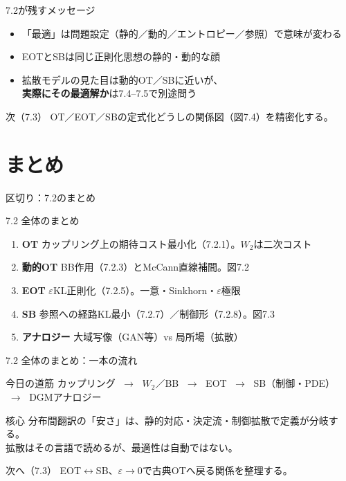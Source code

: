 \asmain
\begin{frame}{7.2が残すメッセージ}
    \begin{itemize}
        \item 「最適」は問題設定（静的／動的／エントロピー／参照）で意味が変わる
        \item EOTとSBは同じ正則化思想の静的・動的な顔
        \item 拡散モデルの見た目は動的OT／SBに近いが、\\
        \textbf{実際にその最適解か}は7.4--7.5で別途問う
    \end{itemize}
    \begin{block}{次（7.3）}
        OT／EOT／SBの定式化どうしの関係図（図7.4）を精密化する。
    \end{block}
\end{frame}
\section{まとめ}
\asmain
\begin{frame}{区切り：7.2のまとめ}
    \tableofcontents[currentsection]
\end{frame}
\asmain
\begin{frame}{7.2 全体のまとめ}
    \begin{enumerate}
        \item \textbf{OT}
        カップリング上の期待コスト最小化（7.2.1）。$W_{2}$は二次コスト
        \item \textbf{動的OT}
        BB作用（7.2.3）とMcCann直線補間。図7.2
        \item \textbf{EOT}
        $\varepsilon$KL正則化（7.2.5）。一意・Sinkhorn・$\varepsilon$極限
        \item \textbf{SB}
        参照への経路KL最小（7.2.7）／制御形（7.2.8）。図7.3
        \item \textbf{アナロジー}
        大域写像（GAN等）vs 局所場（拡散）
    \end{enumerate}
\end{frame}
\asmain
\begin{frame}{7.2 全体のまとめ：一本の流れ}
    \begin{block}{今日の道筋}
        カップリング
        $\;\to\;$
        $W_{2}$／BB
        $\;\to\;$
        EOT
        $\;\to\;$
        SB（制御・PDE）
        $\;\to\;$
        DGMアナロジー
    \end{block}
    \begin{block}{核心}
        分布間翻訳の「安さ」は、静的対応・決定流・制御拡散で定義が分岐する。\\
        拡散はその言語で読めるが、最適性は自動ではない。
    \end{block}
    \begin{block}{次へ（7.3）}
        EOT$\leftrightarrow$SB、$\varepsilon\to 0$で古典OTへ戻る関係を整理する。
    \end{block}
\end{frame}
